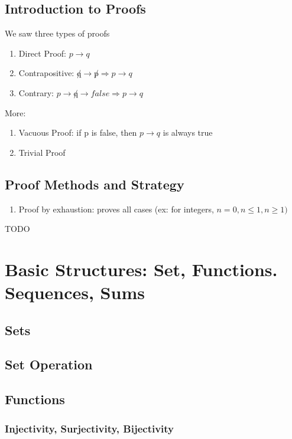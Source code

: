 \documentclass{article}
\begin{document}
\subsection{Introduction to Proofs}

We saw three types of proofs

\begin{enumerate}
    \item Direct Proof: $ p \to q $
    \item Contrapositive: $ \not q \to \not p \Longrightarrow p \to q$
    \item Contrary: $ p \to \not q \rightarrow false \Longrightarrow
	p \to q $
\end{enumerate}

More:
\begin{enumerate}
    \item Vacuous Proof: if p is false, then $ p \to q$ is always true
    \item Trivial Proof
\end{enumerate}

\subsection{Proof Methods and Strategy}

\begin{enumerate}
    \item Proof by exhaustion: proves all cases (ex: for integers, $ n =0,
	n \leq 1, n \geq 1) $
\end{enumerate}

TODO

\section{Basic Structures: Set, Functions. Sequences, Sums}

\subsection{Sets}
\subsection{Set Operation}
\subsection{Functions}

\subsubsection{Injectivity, Surjectivity, Bijectivity}%
\label{ssub:Injectivity, Surjectivity, Bijectivity}
\end{document}
